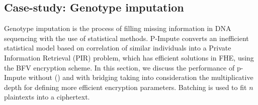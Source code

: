 \subsection{Case-study: Genotype imputation}\label{sss:genotype}

Genotype imputation is the process of filling missing information in DNA sequencing with the use of statistical methods. \iffalse Due to the computer-intensive nature of the task, cloud servers are a natural platform for processing the data. Furthermore, privacy requirements of medical information make solutions using homomorphic encryption desirable. \fi P-Impute \cite{GURSOY2021} converts an inefficient statistical model based on correlation of similar individuals %
into a Private Information Retrieval (PIR) problem, which has efficient solutions in FHE, using the BFV encryption scheme. In this section, we discuss the performance of p-Impute without (\secuint) and with bridging taking into consideration the multiplicative depth for defining more efficient encryption parameters. Batching is used to fit $n$ plaintexts into a ciphertext.

